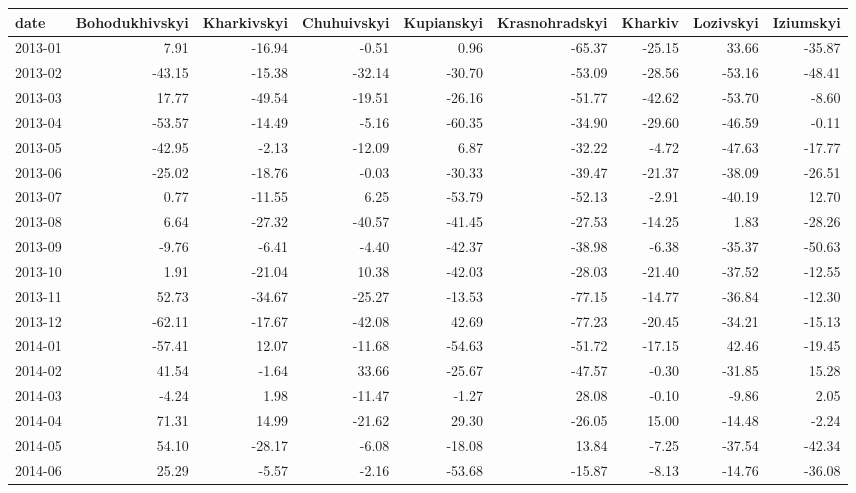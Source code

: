 \begin{table}[ht]
\centering
\begin{tabular}{lrrrrrrrr}
  \hline
date & Bohodukhivskyi & Kharkivskyi & Chuhuivskyi & Kupianskyi & Krasnohradskyi & Kharkiv & Lozivskyi & Iziumskyi \\ 
  \hline
2013-01 & 7.91 & -16.94 & -0.51 & 0.96 & -65.37 & -25.15 & 33.66 & -35.87 \\ 
  2013-02 & -43.15 & -15.38 & -32.14 & -30.70 & -53.09 & -28.56 & -53.16 & -48.41 \\ 
  2013-03 & 17.77 & -49.54 & -19.51 & -26.16 & -51.77 & -42.62 & -53.70 & -8.60 \\ 
  2013-04 & -53.57 & -14.49 & -5.16 & -60.35 & -34.90 & -29.60 & -46.59 & -0.11 \\ 
  2013-05 & -42.95 & -2.13 & -12.09 & 6.87 & -32.22 & -4.72 & -47.63 & -17.77 \\ 
  2013-06 & -25.02 & -18.76 & -0.03 & -30.33 & -39.47 & -21.37 & -38.09 & -26.51 \\ 
  2013-07 & 0.77 & -11.55 & 6.25 & -53.79 & -52.13 & -2.91 & -40.19 & 12.70 \\ 
  2013-08 & 6.64 & -27.32 & -40.57 & -41.45 & -27.53 & -14.25 & 1.83 & -28.26 \\ 
  2013-09 & -9.76 & -6.41 & -4.40 & -42.37 & -38.98 & -6.38 & -35.37 & -50.63 \\ 
  2013-10 & 1.91 & -21.04 & 10.38 & -42.03 & -28.03 & -21.40 & -37.52 & -12.55 \\ 
  2013-11 & 52.73 & -34.67 & -25.27 & -13.53 & -77.15 & -14.77 & -36.84 & -12.30 \\ 
  2013-12 & -62.11 & -17.67 & -42.08 & 42.69 & -77.23 & -20.45 & -34.21 & -15.13 \\ 
  2014-01 & -57.41 & 12.07 & -11.68 & -54.63 & -51.72 & -17.15 & 42.46 & -19.45 \\ 
  2014-02 & 41.54 & -1.64 & 33.66 & -25.67 & -47.57 & -0.30 & -31.85 & 15.28 \\ 
  2014-03 & -4.24 & 1.98 & -11.47 & -1.27 & 28.08 & -0.10 & -9.86 & 2.05 \\ 
  2014-04 & 71.31 & 14.99 & -21.62 & 29.30 & -26.05 & 15.00 & -14.48 & -2.24 \\ 
  2014-05 & 54.10 & -28.17 & -6.08 & -18.08 & 13.84 & -7.25 & -37.54 & -42.34 \\ 
  2014-06 & 25.29 & -5.57 & -2.16 & -53.68 & -15.87 & -8.13 & -14.76 & -36.08 \\ 

\end{tabular}
\end{table}
